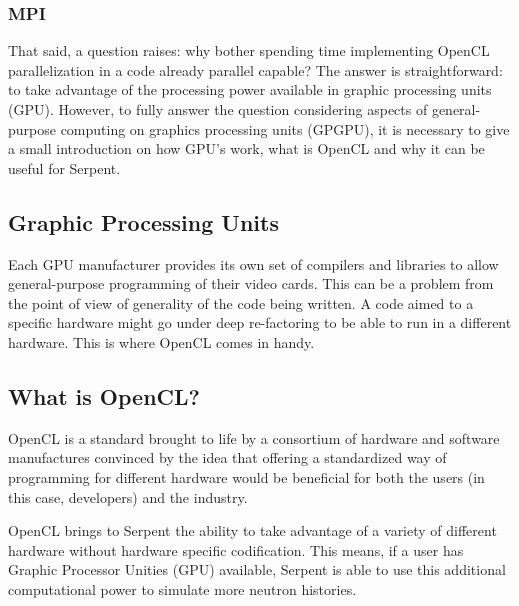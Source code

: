 \documentclass[twoside,a4paper,12pt,english,draft]{anstrans}
\begin{document}
\subsubsection{MPI}

That said, a question raises: why bother spending time implementing OpenCL parallelization
in a code already parallel capable? The answer is straightforward: to take
advantage of the processing power available in graphic processing units (GPU).
However, to fully answer the question considering aspects of general-purpose computing on graphics
processing units (GPGPU), it is necessary to give a small introduction on how GPU's work, what is OpenCL and why
it can be useful for Serpent.


\subsection{Graphic Processing Units}

Each GPU manufacturer provides its own set of compilers and libraries to allow general-purpose
programming of their video cards. This can be a problem from the point of view of generality of
the code being written. A code aimed to a specific hardware might go under deep re-factoring to
be able to run in a different hardware. This is where OpenCL comes in handy.

\subsection{What is OpenCL?}

OpenCL\cite{Stone2010} is a standard brought to life by a consortium of hardware and software
manufactures convinced by the idea that offering a standardized way of programming for different
hardware would be beneficial for both the users (in this case, developers) and the industry.

OpenCL brings to Serpent the ability to take advantage of a variety of different hardware
without hardware specific codification. This means, if a user has Graphic Processor Unities (GPU)
available, Serpent is able to use this additional computational power to simulate
more neutron histories.
\end{document}
